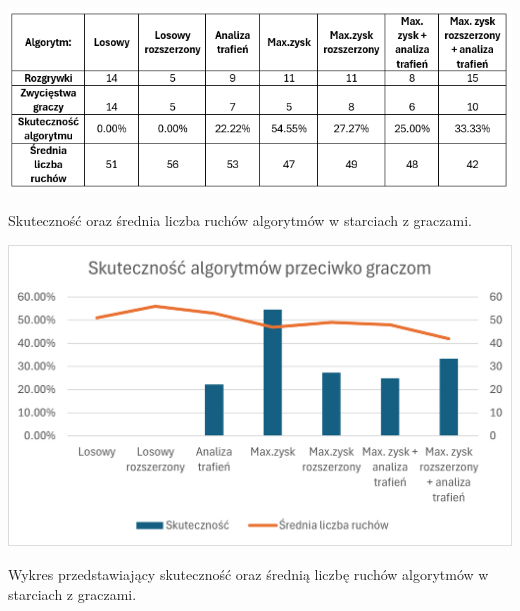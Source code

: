 \begin{table}[!h]
    \label{fig:vs-people}
    \centering \includegraphics[width=0.9\linewidth]{img/vs_people.PNG}
    \caption{Skuteczność oraz średnia liczba ruchów algorytmów w starciach z graczami.}
\end{table}

\begin{table}[!h]
    \label{fig:vs-people-chart}
    \centering \includegraphics[width=0.9\linewidth]{img/vs_people_chart.png}
    \caption{Wykres przedstawiający skuteczność oraz średnią liczbę ruchów algorytmów w starciach z graczami.}
\end{table}